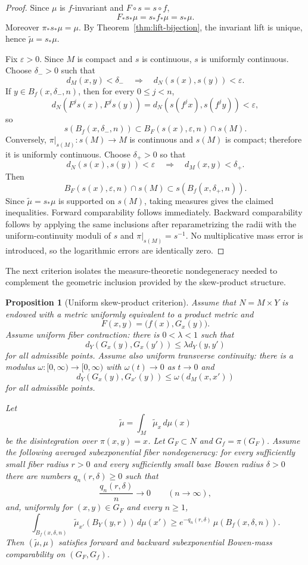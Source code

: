 \documentclass[11pt,a4paper]{article}
\newtheorem{proposition}[theorem]{Proposition}
\newcommand{\eps}{\varepsilon}
\begin{document}
\begin{proof}
Since $\mu$ is $f$-invariant and $F\circ s=s\circ f$,
\[
F_*s_*\mu=s_*f_*\mu=s_*\mu.
\]
Moreover $\pi_*s_*\mu=\mu$. By Theorem~\ref{thm:lift-bijection}, the invariant
lift is unique, hence $\widetilde\mu=s_*\mu$.

Fix $\eps>0$. Since $M$ is compact and $s$ is continuous, $s$ is uniformly
continuous. Choose $\delta_->0$ such that
\[
d_M(x,y)<\delta_-
\quad\Longrightarrow\quad
d_N(s(x),s(y))<\eps.
\]
If $y\in B_f(x,\delta_-,n)$, then for every $0\le j<n$,
\[
d_N(F^js(x),F^js(y))
=d_N(s(f^jx),s(f^jy))<\eps,
\]
so
\[
s(B_f(x,\delta_-,n))\subset B_F(s(x),\eps,n)\cap s(M).
\]
Conversely, $\pi|_{s(M)}:s(M)\to M$ is continuous and $s(M)$ is compact;
therefore it is uniformly continuous. Choose $\delta_+>0$ so that
\[
d_N(s(x),s(y))<\eps
\quad\Longrightarrow\quad
d_M(x,y)<\delta_+.
\]
Then
\[
B_F(s(x),\eps,n)\cap s(M)
\subset s(B_f(x,\delta_+,n)).
\]
Since $\widetilde\mu=s_*\mu$ is supported on $s(M)$, taking measures gives the
claimed inequalities. Forward comparability follows immediately. Backward
comparability follows by applying the same inclusions after reparametrizing
the radii with the uniform-continuity moduli of $s$ and
$\pi|_{s(M)}=s^{-1}$. No multiplicative mass error is introduced, so the
logarithmic errors are identically zero.
\end{proof}

The next criterion isolates the measure-theoretic nondegeneracy needed to
complement the geometric inclusion provided by the skew-product structure.

\begin{proposition}[Uniform skew-product criterion]
\label{prop:uniform-skew-bowen}
Assume that $N=M\times Y$ is endowed with a metric uniformly equivalent to a
product metric and
\[
F(x,y)=\bigl(f(x),G_x(y)\bigr).
\]
Assume uniform fiber contraction: there is $0<\lambda<1$ such that
\[
d_Y(G_x(y),G_x(y'))\le\lambda d_Y(y,y')
\]
for all admissible points. Assume also uniform transverse continuity: there is
a modulus $\omega:[0,\infty)\to[0,\infty)$ with $\omega(t)\to0$ as $t\to0$
and
\[
d_Y(G_x(y),G_{x'}(y))\le \omega(d_M(x,x'))
\]
for all admissible points.

Let
\[
\widetilde\mu=\int_M\widetilde\mu_x\,d\mu(x)
\]
be the disintegration over $\pi(x,y)=x$. Let $G_F\subset N$ and
$G_f=\pi(G_F)$. Assume the following \emph{averaged subexponential fiber
nondegeneracy}: for every sufficiently small fiber radius $r>0$ and every
sufficiently small base Bowen radius $\delta>0$ there are numbers
$q_n(r,\delta)\ge0$ such that
\[
\frac{q_n(r,\delta)}{n}\longrightarrow0
\qquad (n\to\infty),
\]
and, uniformly for $(x,y)\in G_F$ and every $n\ge1$,
\begin{equation}
\label{eq:averaged-lower-fiber-ball-masses}
\int_{B_f(x,\delta,n)}
\widetilde\mu_{x'}(B_Y(y,r))\,d\mu(x')
\ge e^{-q_n(r,\delta)}\,\mu(B_f(x,\delta,n)).
\end{equation}
Then $(\widetilde\mu,\mu)$ satisfies forward and backward subexponential
Bowen-mass comparability on $(G_F,G_f)$.
\end{proposition}
\end{document}
